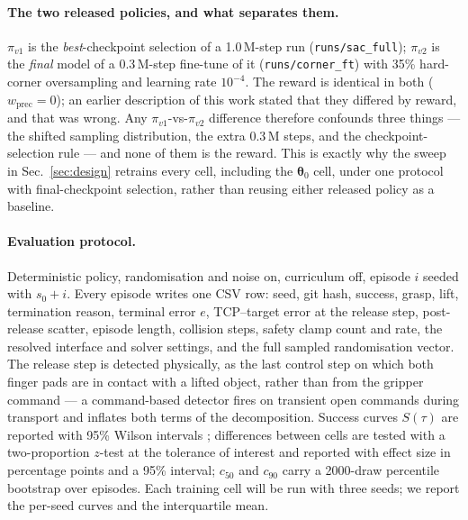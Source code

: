 \documentclass{article}
\newcommand{\iface}{\boldsymbol{\theta}}
\begin{document}
\paragraph{The two released policies, and what separates them.}
$\pi_{v1}$ is the \emph{best}-checkpoint selection of a 1.0\,M-step run
(\texttt{runs/sac\_full}); $\pi_{v2}$ is the \emph{final} model of a 0.3\,M-step
fine-tune of it (\texttt{runs/corner\_ft}) with 35\% hard-corner oversampling
and learning rate $10^{-4}$. The reward is identical in both
($w_{\mathrm{prec}}{=}0$); an earlier description of this work stated that they
differed by reward, and that was wrong. Any $\pi_{v1}$-vs-$\pi_{v2}$ difference
therefore confounds three things --- the shifted sampling distribution, the
extra 0.3\,M steps, and the checkpoint-selection rule --- and none of them is
the reward. This is exactly why the sweep in Sec.~\ref{sec:design} retrains
every cell, including the $\iface_0$ cell, under one protocol with final-checkpoint
selection, rather than reusing either released policy as a baseline.

\paragraph{Evaluation protocol.}
Deterministic policy, randomisation and noise on, curriculum off, episode $i$
seeded with $s_0+i$. Every episode writes one CSV row: seed, git hash, success,
grasp, lift, termination reason, terminal error $e$, TCP--target error at the
release step, post-release scatter, episode length, collision steps, safety
clamp count and rate, the resolved interface and solver settings, and the full
sampled randomisation vector. The release step is detected physically, as the
last control step on which both finger pads are in contact with a lifted object,
rather than from the gripper command --- a command-based detector fires on
transient open commands during transport and inflates both terms of the
decomposition. Success curves $S(\tau)$ are reported with 95\% Wilson intervals
\citep{wilson1927probable}; differences between cells are tested with a
two-proportion $z$-test at the tolerance of interest and reported with effect
size in percentage points and a 95\% interval; $c_{50}$ and $c_{90}$ carry a
2000-draw percentile bootstrap over episodes. Each training cell will be run
with three seeds; we report the per-seed curves and the interquartile mean.
\end{document}
